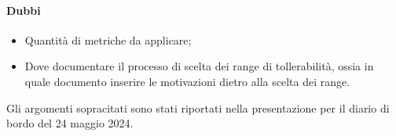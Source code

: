 \paragraph{Dubbi}
\begin{itemize}
	\item Quantità di metriche da applicare;
	\item Dove documentare il processo di scelta dei range di tollerabilità, ossia in quale documento inserire le motivazioni dietro alla scelta dei range.
\end{itemize}

\par Gli argomenti sopracitati sono stati riportati nella presentazione per il diario di bordo del 24 maggio 2024.